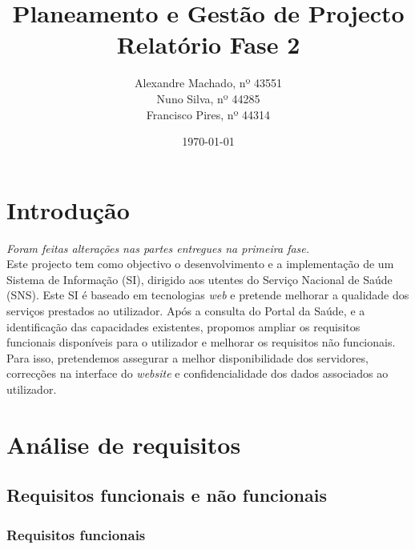 \documentclass[12pt, a4paper, twoside]{report} %
\begin{document}
\title{%
	\textbf{Planeamento e Gestão de Projecto}\\ 
	\large Relatório Fase 2
}

\author{%
Alexandre Machado, nº 43551 \\
Nuno Silva, nº 44285 \\
Francisco Pires, nº 44314 \\
}

\date{\today}
\maketitle
\tableofcontents


\chapter{Introdução}

\textit{Foram feitas alterações nas partes entregues na primeira fase.} \\


Este projecto tem como objectivo o desenvolvimento e a implementação de um Sistema de Informação (SI), dirigido aos utentes do Serviço Nacional de Saúde (SNS). 
Este SI é baseado em tecnologias \textit{web} e pretende melhorar a qualidade dos serviços prestados ao utilizador. 
Após a consulta do Portal da Saúde, e a identificação das capacidades existentes, propomos ampliar os requisitos funcionais disponíveis para o utilizador e melhorar os requisitos não funcionais. 
Para isso, pretendemos assegurar a melhor disponibilidade dos servidores, correcções na interface do \textit{website} e confidencialidade dos dados associados ao utilizador.


\chapter{Análise de requisitos}

\section{Requisitos funcionais e não funcionais}

\subsection{Requisitos funcionais}
\end{document}
